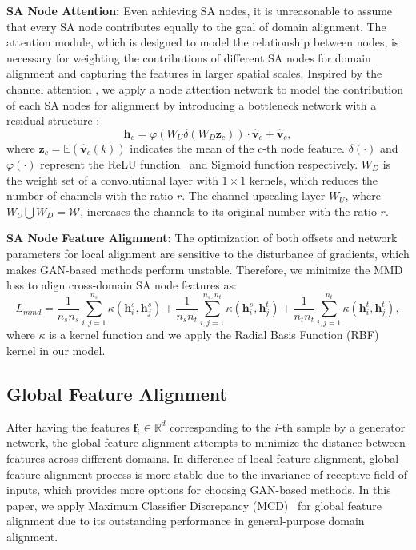 \documentclass{article}
\begin{document}
\textbf{SA Node Attention: }Even achieving SA nodes, it is unreasonable to assume that every SA node contributes equally to the goal of domain alignment. The attention module, which is designed to model the relationship between nodes, is necessary for weighting the contributions of different SA nodes for domain alignment and capturing the features in larger spatial scales. Inspired by the channel attention \cite{zhang2018rcan}, we apply a node attention network to model the contribution of each SA nodes for alignment by introducing a bottleneck network with a residual structure \cite{he2016deep}:
\begin{equation}
\mathbf{h}_c = {\varphi ({{W}}_U \delta({W}_D \mathbf{z}_c) ) }\cdot \hat{\mathbf{v}}_c + \hat{\mathbf{v}}_c,  \label{e3}
\end{equation}
where $\mathbf{z}_c= \mathbb{E}(\hat{\mathbf{v}}_c(k))$ indicates the mean of the $c$-th node feature. $\delta(\cdot)$ and $\varphi(\cdot)$ represent the ReLU function~\cite{nair2010rectified} and Sigmoid function respectively. ${W}_D$ is the weight set of a convolutional layer with $1\times1$ kernels, which reduces the number of channels with the ratio $r$. The channel-upscaling layer ${W}_U$, where ${W}_U \bigcup {W}_D = \mathcal{W}$, increases the channels to its original number with the ratio $r$.






\textbf{SA Node Feature Alignment:} 
The optimization of both offsets and network parameters for local alignment are sensitive to the disturbance of gradients, which makes GAN-based methods perform unstable. Therefore, we minimize the MMD~\cite{borgwardt2006integrating,long2013transfer} loss to align cross-domain SA node features as:
\begin{equation}
L_{mmd} = \frac{1}{n_s  n_s}\sum_{i,j=1}^{n_s}\kappa (\mathbf{h}_i^s,\mathbf{h}_j^s)+\frac{1}{n_s  n_t}\sum_{i,j=1}^{n_s,n_t}\kappa (\mathbf{h}_i^s,\mathbf{h}_j^t)+\frac{1}{n_t  n_t}\sum_{i,j=1}^{n_t}\kappa (\mathbf{h}_i^t,\mathbf{h}_j^t), \label{e5}
\end{equation}
where $\kappa$ is a kernel function and we apply the Radial Basis Function (RBF) kernel in our model.

\subsection{Global Feature Alignment}

After having the features $\mathbf{f}_i \in \mathbb{R}^{d}$ corresponding to the $i$-th sample by a generator network, the global feature alignment attempts to minimize the distance between features across different domains. In difference of local feature alignment, global feature alignment process is more stable due to the invariance of receptive field of inputs, which provides more options for choosing GAN-based methods. In this paper, we apply Maximum Classifier Discrepancy (MCD)~\cite{saito2018maximum} for global feature alignment due to its outstanding performance in general-purpose domain alignment.
\end{document}
